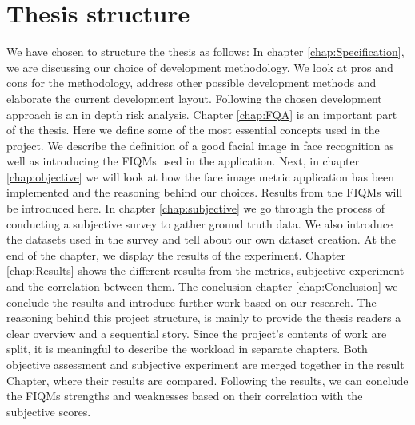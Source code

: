 \section{Thesis structure}
We have chosen to structure the thesis as follows: In chapter \ref{chap:Specification}, we are discussing our choice of development methodology. We look at pros and cons for the methodology, address other possible development methods and elaborate the current development layout. Following the chosen development approach is an in depth risk analysis. Chapter \ref{chap:FQA} is an important part of the thesis. Here we define some of the most essential concepts used in the project. We describe the definition of a good facial image in face recognition as well as introducing the FIQMs used in the application. Next, in chapter \ref{chap:objective} we will look at how the face image metric application has been implemented and the reasoning behind our choices. Results from the FIQMs will be introduced here. In chapter \ref{chap:subjective} we go through the process of conducting a subjective survey to gather ground truth data. We also introduce the datasets used in the survey and tell about our own dataset creation. At the end of the chapter, we display the results of the experiment. 
Chapter \ref{chap:Results} shows the different results from the metrics, subjective experiment and the correlation between them. The conclusion chapter \ref{chap:Conclusion} we conclude the results and introduce further work based on our research. 
The reasoning behind this project structure, is mainly to provide the thesis readers a clear overview and a sequential story. Since the project's contents of work are split, it is meaningful to describe the workload in separate chapters. Both objective assessment and subjective experiment are merged together in the result Chapter, where their results are compared. Following the results, we can conclude the FIQMs strengths and weaknesses based on their correlation with the subjective scores.   
